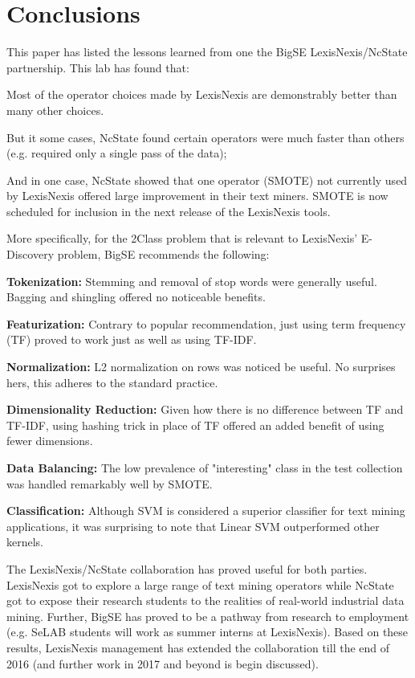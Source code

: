 \documentclass{sig-alternate-05-2015}
\newcommand{\bi}{\begin{itemize*}}
\newcommand{\ei}{\end{itemize*}}
\newcommand{\be}{\begin{enumerate*}}
\newcommand{\ee}{\end{enumerate*}}
\theoremstyle{break}
\begin{document}
\section{Conclusions}
\label{sect:Conclusions}



This paper has listed the lessons learned from one the BigSE LexisNexis/NcState partnership.
This lab has found that: 
\bi
\item 
Most  of the operator choices made by LexisNexis are
  demonstrably better than many other choices.
\item 
But it some cases, NcState found     certain operators
were much faster than others (e.g. required only a single pass
of the data);
\item
And in one case, NcState showed that one operator (SMOTE) not currently
used by LexisNexis offered large improvement in their text miners.
SMOTE is now scheduled for inclusion in the next release
of the LexisNexis tools.
\ei
More specifically, for the 2Class problem that is relevant to
LexisNexis' E-Discovery problem, BigSE recommends the following:
\be
\item \textbf{Tokenization:} Stemming and removal of stop words were generally useful. Bagging and shingling offered no noticeable benefits. 
\item \textbf{Featurization:} Contrary to popular recommendation, just using term frequency (TF) proved to work just as well as using TF-IDF.
\item \textbf{Normalization:} L2 normalization on rows was noticed be useful. No surprises hers, this adheres to the standard practice.
\item \textbf{Dimensionality Reduction:} Given how there is no difference between TF and TF-IDF, using hashing trick in place of TF offered an added benefit of using fewer dimensions.
\item \textbf{Data Balancing:} The low prevalence of "interesting" class in the test collection was handled remarkably well by SMOTE.
\item \textbf{Classification:} Although SVM is considered a superior classifier for text mining applications, it was surprising to note that Linear SVM outperformed other kernels.
\ee



The LexisNexis/NcState collaboration has proved useful
for both parties.
LexisNexis got to explore a large range of text mining operators while
NcState got to expose their research students to the
realities of real-world industrial data mining.
 Further, BigSE has proved to be a pathway from
research to employment (e.g. SeLAB  students  will work as    summer interns at  LexisNexis). 
Based on  these results, LexisNexis management has extended the collaboration till the end of 2016 (and further work in 2017
and beyond is begin discussed).
\end{document}
